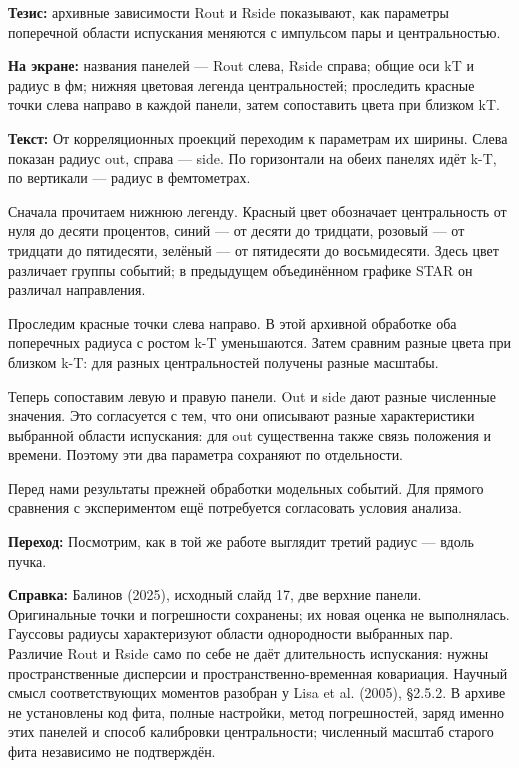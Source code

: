 \documentclass[11pt,a4paper]{article}
\begin{document}
\textbf{Тезис:} архивные зависимости Rout и Rside показывают, как параметры поперечной области испускания меняются с импульсом пары и центральностью.

\textbf{На экране:} названия панелей — Rout слева, Rside справа; общие оси kT и радиус в фм; нижняя цветовая легенда центральностей; проследить красные точки слева направо в каждой панели, затем сопоставить цвета при близком kT.

\textbf{Текст:} От корреляционных проекций переходим к параметрам их ширины. Слева показан радиус out, справа — side. По горизонтали на обеих панелях идёт k-T, по вертикали — радиус в фемтометрах.

Сначала прочитаем нижнюю легенду. Красный цвет обозначает центральность от нуля до десяти процентов, синий — от десяти до тридцати, розовый — от тридцати до пятидесяти, зелёный — от пятидесяти до восьмидесяти. Здесь цвет различает группы событий; в предыдущем объединённом графике STAR он различал направления.

Проследим красные точки слева направо. В этой архивной обработке оба поперечных радиуса с ростом k-T уменьшаются. Затем сравним разные цвета при близком k-T: для разных центральностей получены разные масштабы.

Теперь сопоставим левую и правую панели. Out и side дают разные численные значения. Это согласуется с тем, что они описывают разные характеристики выбранной области испускания: для out существенна также связь положения и времени. Поэтому эти два параметра сохраняют по отдельности.

Перед нами результаты прежней обработки модельных событий. Для прямого сравнения с экспериментом ещё потребуется согласовать условия анализа.

\textbf{Переход:} Посмотрим, как в той же работе выглядит третий радиус — вдоль пучка.

\textbf{Справка:} Балинов (2025), исходный слайд 17, две верхние панели. Оригинальные точки и погрешности сохранены; их новая оценка не выполнялась. Гауссовы радиусы характеризуют области однородности выбранных пар. Различие Rout и Rside само по себе не даёт длительность испускания: нужны пространственные дисперсии и пространственно-временная ковариация. Научный смысл соответствующих моментов разобран у Lisa et al. (2005), §2.5.2. В архиве не установлены код фита, полные настройки, метод погрешностей, заряд именно этих панелей и способ калибровки центральности; численный масштаб старого фита независимо не подтверждён.
\end{document}

